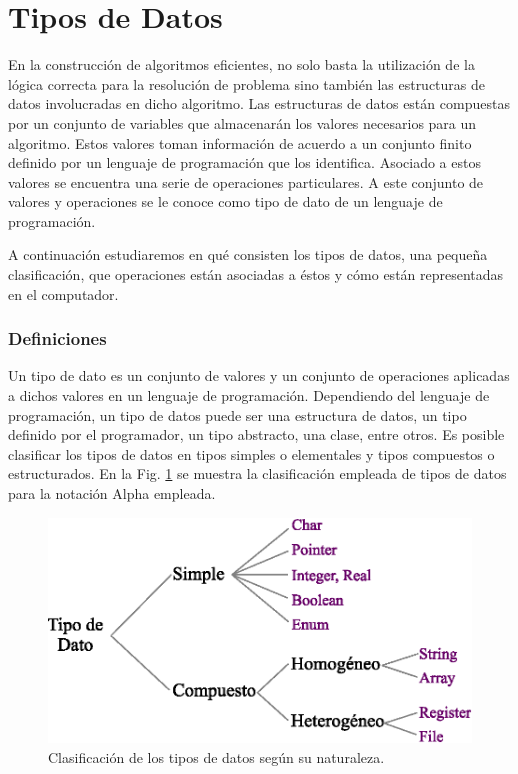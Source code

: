 \newpage
\part{Tipos de Datos}

En la construcción de algoritmos eficientes, no solo basta la utilización de la lógica correcta para la resolución de problema sino también las estructuras de datos involucradas en dicho algoritmo. Las estructuras de datos están compuestas por  un conjunto de variables que almacenarán los valores necesarios para un algoritmo. Estos valores toman información de acuerdo a un conjunto finito definido por un lenguaje de programación que los identifica. Asociado a estos valores se encuentra una serie de operaciones particulares. A este conjunto de valores y operaciones se le conoce como tipo de dato de un lenguaje de programación.

A continuación estudiaremos en qué consisten los tipos de datos, una pequeña clasificación, que operaciones están asociadas a éstos y cómo están representadas en el computador. 

\section{Definiciones}

Un tipo de dato es un conjunto de valores y un conjunto de operaciones aplicadas a dichos valores en un lenguaje de programación. Dependiendo del lenguaje de programación, un tipo de datos puede ser una estructura de datos, un tipo definido por el programador, un tipo abstracto, una clase, entre otros. Es posible clasificar los tipos de datos en tipos simples o elementales y tipos compuestos o estructurados. En la Fig. \ref{fig:tipodato} se muestra la clasificación empleada de tipos de datos para la notación Alpha empleada.

\begin{figure}[!htb]
\centering
\includegraphics[scale=.7]{images/tipoDeDato.eps}
\caption{Clasificación de los tipos de datos según su naturaleza.}
\label{fig:tipodato}
\end{figure}

